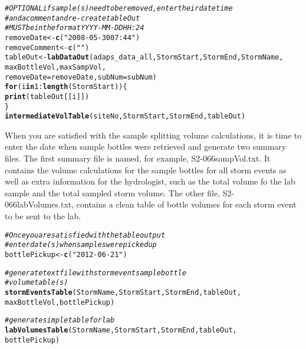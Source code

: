 \documentclass[a4paper,11pt]{article}\usepackage[]{graphicx}\usepackage[]{color}
\makeatletter
\newcommand{\hlnum}[1]{\textcolor[rgb]{0.686,0.059,0.569}{#1}}%
\newcommand{\hlstr}[1]{\textcolor[rgb]{0.192,0.494,0.8}{#1}}%
\newcommand{\hlcom}[1]{\textcolor[rgb]{0.678,0.584,0.686}{\textit{#1}}}%
\newcommand{\hlopt}[1]{\textcolor[rgb]{0,0,0}{#1}}%
\newcommand{\hlstd}[1]{\textcolor[rgb]{0.345,0.345,0.345}{#1}}%
\newcommand{\hlkwa}[1]{\textcolor[rgb]{0.161,0.373,0.58}{\textbf{#1}}}%
\newcommand{\hlkwb}[1]{\textcolor[rgb]{0.69,0.353,0.396}{#1}}%
\newcommand{\hlkwc}[1]{\textcolor[rgb]{0.333,0.667,0.333}{#1}}%
\newcommand{\hlkwd}[1]{\textcolor[rgb]{0.737,0.353,0.396}{\textbf{#1}}}%
\newenvironment{kframe}{%
 \def\at@end@of@kframe{}%
 \ifinner\ifhmode%
  \def\at@end@of@kframe{\end{minipage}}%
  \begin{minipage}{\columnwidth}%
 \fi\fi%
 \def\FrameCommand##1{\hskip\@totalleftmargin \hskip-\fboxsep
 \colorbox{shadecolor}{##1}\hskip-\fboxsep
     \hskip-\linewidth \hskip-\@totalleftmargin \hskip\columnwidth}%
 \MakeFramed {\advance\hsize-\width
   \@totalleftmargin\z@ \linewidth\hsize
   \@setminipage}}%
 {\par\unskip\endMakeFramed%
 \at@end@of@kframe}
\newenvironment{knitrout}{}{} %
\makeatother
\begin{document}
\begin{knitrout}
\color{fgcolor}\begin{kframe}
\begin{alltt}
\hlcom{# OPTIONAL if sample(s) need to be removed, enter their datetime  }
\hlcom{# and a comment and re-create tableOut}
\hlcom{# MUST be in the format YYYY-MM-DD HH:24}
\hlstd{removeDate} \hlkwb{<-} \hlkwd{c}\hlstd{(}\hlstr{"2008-05-30 07:44"}\hlstd{)}
\hlstd{removeComment} \hlkwb{<-} \hlkwd{c}\hlstd{(}\hlstr{""}\hlstd{)}
\hlstd{tableOut} \hlkwb{<-} \hlkwd{labDataOut}\hlstd{(adaps_data_all,StormStart,StormEnd,StormName,}
                       \hlstd{maxBottleVol,maxSampVol,}
                       \hlkwc{removeDate}\hlstd{=removeDate,}\hlkwc{subNum}\hlstd{=subNum)}
\hlkwa{for} \hlstd{(i} \hlkwa{in} \hlnum{1}\hlopt{:}\hlkwd{length}\hlstd{(StormStart))\{}
  \hlkwd{print}\hlstd{(tableOut[[i]])}
\hlstd{\}}
\hlkwd{intermediateVolTable}\hlstd{(siteNo,StormStart,StormEnd,tableOut)}
\end{alltt}
\end{kframe}
\end{knitrout}


When you are satisfied with the sample splitting volume calculations, it is time to enter the date when sample bottles were retrieved and generate two summary files. The first summary file is named, for example, S2-066sampVol.txt. It contains the volume calculations for the sample bottles for all storm events as well as extra information for the hydrologist, such as the total volume fo the lab sample and the total sampled storm volume. The other file, S2-066labVolumes.txt, contains a clean table of bottle volumes for each storm event to be sent to the lab.

\begin{knitrout}
\color{fgcolor}\begin{kframe}
\begin{alltt}
\hlcom{#Once you are satisfied with the table output}
\hlcom{#enter date(s) when samples were picked up }
\hlstd{bottlePickup} \hlkwb{<-} \hlkwd{c}\hlstd{(}\hlstr{"2012-06-21"}\hlstd{)}

\hlcom{# generate text file with storm event sample bottle }
\hlcom{# volume table(s)}
\hlkwd{stormEventsTable}\hlstd{(StormName,StormStart,StormEnd,tableOut,}
                 \hlstd{maxBottleVol,bottlePickup)}

\hlcom{# generate simple table for lab}
\hlkwd{labVolumesTable}\hlstd{(StormName,StormStart,StormEnd,tableOut,}
                \hlstd{bottlePickup)}
\end{alltt}
\end{kframe}
\end{knitrout}
\end{document}
